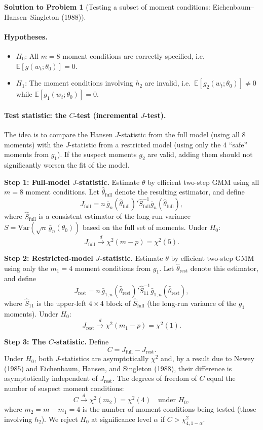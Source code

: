 \documentclass[12pt]{article}
\newcommand{\E}{\mathbb E}
\newcommand{\Var}{\mathrm{Var}}
\theoremstyle{definition}
\newtheorem{solution}{Solution to Problem}
\begin{document}
\begin{solution}[Testing a subset of moment conditions: Eichenbaum--Hansen--Singleton (1988)]
\bigskip
\paragraph{Hypotheses.}
\begin{itemize}
    \item $H_0$: All $m=8$ moment conditions are correctly specified, i.e.\ $\E[g(w_t;\theta_0)]=0$.
    \item $H_1$: The moment conditions involving $h_2$ are invalid, i.e.\ $\E[g_2(w_t;\theta_0)]\neq 0$ while $\E[g_1(w_t;\theta_0)]=0$.
\end{itemize}

\bigskip
\paragraph{Test statistic: the $C$-test (incremental $J$-test).} The idea is to compare the Hansen $J$-statistic from the full model (using all 8 moments) with the $J$-statistic from a restricted model (using only the 4 ``safe'' moments from $g_1$). If the suspect moments $g_2$ are valid, adding them should not significantly worsen the fit of the model.

\medskip
\noindent\textbf{Step 1: Full-model $J$-statistic.} Estimate $\theta$ by efficient two-step GMM using all $m=8$ moment conditions. Let $\hat{\theta}_{\text{full}}$ denote the resulting estimator, and define
\[
J_{\text{full}} = n\,\bar{g}_n(\hat{\theta}_{\text{full}})'\hat{S}_{\text{full}}^{-1}\bar{g}_n(\hat{\theta}_{\text{full}}),
\]
where $\hat{S}_{\text{full}}$ is a consistent estimator of the long-run variance $S=\Var(\sqrt{n}\,\bar{g}_n(\theta_0))$ based on the full set of moments. Under $H_0$:
\[
J_{\text{full}} \xrightarrow{d} \chi^2(m-p) = \chi^2(5).
\]

\noindent\textbf{Step 2: Restricted-model $J$-statistic.} Estimate $\theta$ by efficient two-step GMM using only the $m_1=4$ moment conditions from $g_1$. Let $\hat{\theta}_{\text{rest}}$ denote this estimator, and define
\[
J_{\text{rest}} = n\,\bar{g}_{1,n}(\hat{\theta}_{\text{rest}})'\hat{S}_{11}^{-1}\bar{g}_{1,n}(\hat{\theta}_{\text{rest}}),
\]
where $\hat{S}_{11}$ is the upper-left $4\times 4$ block of $\hat{S}_{\text{full}}$ (the long-run variance of the $g_1$ moments). Under $H_0$:
\[
J_{\text{rest}} \xrightarrow{d} \chi^2(m_1-p) = \chi^2(1).
\]

\noindent\textbf{Step 3: The $C$-statistic.} Define
\[
\boxed{C = J_{\text{full}} - J_{\text{rest}}.}
\]
Under $H_0$, both $J$-statistics are asymptotically $\chi^2$ and, by a result due to Newey (1985) and Eichenbaum, Hansen, and Singleton (1988), their difference is asymptotically independent of $J_{\text{rest}}$. The degrees of freedom of $C$ equal the number of suspect moment conditions:
\[
\boxed{C \xrightarrow{d} \chi^2(m_2) = \chi^2(4) \quad\text{under }H_0,}
\]
where $m_2=m-m_1=4$ is the number of moment conditions being tested (those involving $h_2$). We reject $H_0$ at significance level $\alpha$ if $C>\chi^2_{4,1-\alpha}$.
\end{solution}
\end{document}
